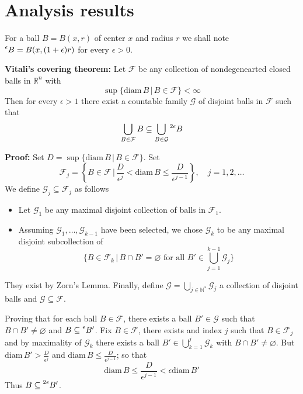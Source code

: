 \documentclass{article}
\begin{document}
\section{Analysis results}

For a ball $B=B(x, r)$ of center $x$ and radius $r$ we shall note $\prescript{\epsilon}{}B
=B(x, (1+\epsilon)r)$ for every $\epsilon>0$.

\vspace{1ex}
\textbf{Vitali's covering theorem:}
Let $\mathcal{F}$ be any collection of nondegenearted closed balls in
$\mathbb{R}^n$ with
\[ \sup\{\text{diam}\,B\,|\, B\in\mathcal{F}\}<\infty \]
Then for every $\epsilon>1$ there exist a countable family $\mathcal{G}$ of
disjoint balls in $\mathcal{F}$ such that
\[\bigcup_{B\in\mathcal{F}}B\subseteq\bigcup_{B\in\mathcal{G}}\prescript{2\epsilon}{}B\]

\vspace{1ex}
\textbf{Proof:}
Set $D=\sup\{\text{diam}\,B\,|\,B\in \mathcal{F}\}$. Set
\[\mathcal{F}_j=\left\{B\in\mathcal{F}\,|\,\frac{D}{\epsilon^j}<\text{diam}\,B\leq\frac{D}{\epsilon^{j-1}}\right\},\quad j=1,2,\ldots\]
We define $\mathcal{G}_j\subseteq\mathcal{F}_j$ as follows
\begin{itemize}
    \item Let $\mathcal{G}_1$ be any maximal disjoint collection of balls in
        $\mathcal{F}_1$.

    \item Assuming $\mathcal{G}_1,\ldots,\mathcal{G}_{k-1}$ have been selected,
        we chose $\mathcal{G}_k$ to be any maximal disjoint subcollection of
        \[ \{B\in\mathcal{F}_k\,|\,B\cap B'=\varnothing\text{ for all }B'\in\bigcup_{j=1}^{k-1}\mathcal{G}_j\}\]
\end{itemize}
They exist by Zorn's Lemma. Finally, define $\mathcal{G}=\bigcup_{j\in\mathbb{N}^*}\mathcal{G}_j$
a collection of disjoint balls and $\mathcal{G}\subseteq\mathcal{F}$.

\vspace{1ex}
Proving that for each ball $B\in\mathcal{F}$, there exists a ball $B'\in\mathcal{G}$
such that $B\cap B'\neq\varnothing$ and $B\subseteq\prescript{\epsilon}{}B'$. Fix
$B\in\mathcal{F}$, there exists and index $j$ such that $B\in\mathcal{F}_j$ and
by maximality of $\mathcal{G}_k$ there exists a ball $B'\in\bigcup_{k=1}^j
\mathcal{G}_k$ with $B\cap B'\neq\varnothing$. But $\text{diam}\,B'>\frac{D}{\epsilon^j}$
and $\text{diam}\,B\leq\frac{D}{\epsilon^{j-1}}$; so that
\[ \text{diam}\,B\leq \frac{D}{\epsilon^{j-1}} < \epsilon\text{diam}\,B'\]
Thus $B\subseteq\prescript{2\epsilon}{}B'$.
\end{document}
